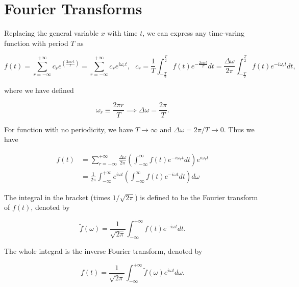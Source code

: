 \documentclass[english,a4paper,12pt]{report}
\begin{document}
\section{Fourier Transforms}

Replacing the general variable \(x\) with time \(t\), we can express any time-varing function with period \(T\) as 

\begin{equation}
    f(t) = \sum_{r=-\infty}^{+\infty} c_{r} e^{\left( \frac{2\pi irt}{T}  \right)} = \sum_{r=-\infty}^{+\infty} c_{r} e^{i\omega _{r} t }, ~~~ c_{r} = \frac{1}{T} \int_{-\frac{T}{2} }^{\frac{T}{2} } f(t) e^{-\frac{2\pi irt}{T} }dt = \frac{\Delta \omega }{2\pi } \int_{-\frac{T}{2} }^{\frac{T}{2} } f(t) e^{-i \omega _{r} t} dt    ,        
\end{equation}

where we have defined 

\begin{equation}
    \omega _{r} \equiv \frac{2\pi r}{T} \implies \Delta \omega = \frac{2\pi }{T}.   
\end{equation}

For function with no periodicity, we have \(T \to \infty\) and \(\Delta \omega = 2\pi /T \to 0 \). Thus we have

\begin{equation}
    \begin{aligned} 
    f(t) &= \sum_{r=-\infty}^{+\infty} \frac{\Delta \omega }{2\pi } \left( \int_{-\infty}^{\infty } f(t) e^{- i \omega _{r} t} dt \right) e^{i \omega _{r} t} \\
    &= \frac{1}{2\pi } \int_{-\infty}^{+\infty} e^{i \omega t}  \left( \int_{-\infty}^{\infty } f(t) e^{- i \omega t} dt \right) d \omega 
    \end{aligned} 
\end{equation}

The integral in the bracket (times \(1 /\sqrt{2\pi }  \)) is defined to be the Fourier transform of \(f(t)\), denoted by 

\begin{equation}
    \tilde{f}(\omega ) = \frac{1}{\sqrt{2\pi } } \int_{-\infty}^{+\infty} f(t) e^{-i \omega t}dt.     
\end{equation}

The whole integral is the inverse Fourier transform, denoted by 

\begin{equation}
    f(t) = \frac{1}{\sqrt{2\pi } } \int_{-\infty}^{+\infty} \tilde{f}(\omega )e^{i \omega t} d \omega .     
\end{equation}
\end{document}
